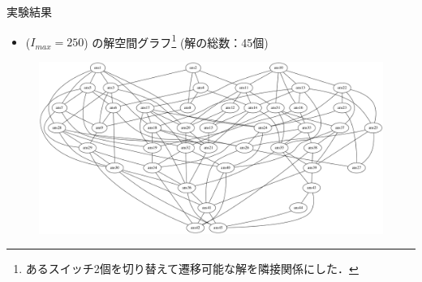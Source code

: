 \documentclass[dvipdfmx,11pt]{beamer}
\begin{document}
\begin{frame}{実験結果}
  \renewcommand{\thefootnote}{\fnsymbol{footnote}}
  \setcounter{footnote}{1}
  \begin{itemize}
   \item {} ($I_{max}=250$) の解空間グラフ\footnote{あるスイッチ2個を切り替えて遷移可能な解を隣接関係にした．} (解の総数：45個)
  \end{itemize}
 \begin{figure}[h]
  \centering
  \includegraphics[scale=0.2]{fig/testlp-c250.png}
 \end{figure}
\end{frame}
\end{document}
